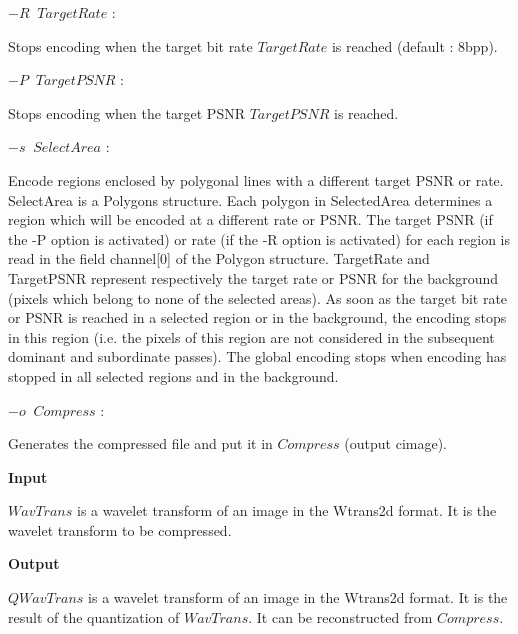 $-R \;\; TargetRate$ : \parbox[t]{13.0cm}{Stops encoding when the target bit 
rate $TargetRate$ is reached (default : 8bpp). }
\newline 

$-P \;\; TargetPSNR$ : \parbox[t]{13.3cm}{Stops encoding when the target PSNR 
$TargetPSNR$ is reached. } 
\newline 

$-s \;\; SelectArea$ : \parbox[t]{13.3cm}{Encode regions enclosed 
by polygonal lines with a different target PSNR or rate. 
SelectArea is a Polygons structure. Each polygon in SelectedArea 
determines a region which will be encoded at a different rate or PSNR. 
The target PSNR (if the -P option is activated) or rate (if the -R option 
is activated) for each region is read in the field channel[0] 
of the Polygon structure. TargetRate and TargetPSNR represent respectively 
the target rate or PSNR for the background (pixels which belong to none 
of the selected areas).  As soon as the target bit rate or PSNR is reached 
in a selected region or in the background, the encoding stops in this 
region (i.e. the pixels of this region are not considered in the subsequent 
dominant and subordinate passes). The global encoding stops when encoding 
has stopped in all selected regions and in the background. } 
\newline 

$-o \;\; Compress$ : \parbox[t]{13.3cm}{Generates the compressed file 
and put it in $Compress$ (output cimage). } 
\newline 

{\bf Input} 
\newline 

$WavTrans$ is a wavelet transform of an image in the Wtrans2d format. 
It is the wavelet transform to be compressed.
\newline 

{\bf Output} 
\newline \nopagebreak

$QWavTrans$ is a wavelet transform of an image in the Wtrans2d format. 
It is the result of the quantization of $WavTrans$. It can be reconstructed 
from $Compress$. 


